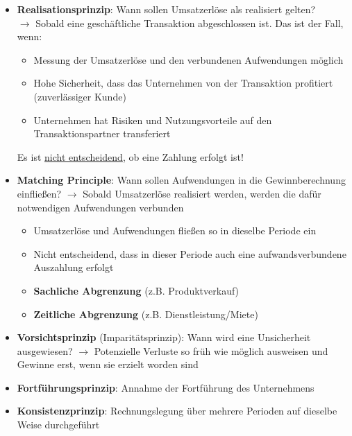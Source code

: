 \begin{itemize}
	\item \textbf{Realisationsprinzip}: Wann sollen Umsatzerlöse als realisiert gelten?\\
	$\rightarrow$ Sobald eine geschäftliche Transaktion abgeschlossen ist. Das ist der Fall, wenn:
	\begin{itemize}
		\item Messung der Umsatzerlöse und den verbundenen Aufwendungen möglich
		\item Hohe Sicherheit, dass das Unternehmen von der Transaktion profitiert (zuverlässiger Kunde)
		\item Unternehmen hat Risiken und Nutzungsvorteile auf den Transaktionspartner transferiert
	\end{itemize}
	Es ist \underline{nicht entscheidend}, ob eine Zahlung erfolgt ist!
	\item \textbf{Matching Principle}: Wann sollen Aufwendungen in die Gewinnberechnung einfließen? 
	$\rightarrow$ Sobald Umsatzerlöse realisiert werden, werden die dafür notwendigen Aufwendungen verbunden
	\begin{itemize}
		\item Umsatzerlöse und Aufwendungen fließen so in dieselbe Periode ein
		\item Nicht entscheidend, dass in dieser Periode auch eine aufwandsverbundene Auszahlung erfolgt
		\item \textbf{Sachliche Abgrenzung} (z.B. Produktverkauf)
		\item \textbf{Zeitliche Abgrenzung} (z.B. Dienstleistung/Miete)
	\end{itemize}
	\item \textbf{Vorsichtsprinzip} (Imparitätsprinzip): Wann wird eine Unsicherheit ausgewiesen?
	$\rightarrow$ Potenzielle Verluste so früh wie möglich ausweisen und Gewinne erst, wenn sie erzielt worden sind
	\item \textbf{Fortführungsprinzip}: Annahme der Fortführung des Unternehmens
	\item \textbf{Konsistenzprinzip}: Rechnungslegung über mehrere Perioden auf dieselbe Weise durchgeführt
\end{itemize}
